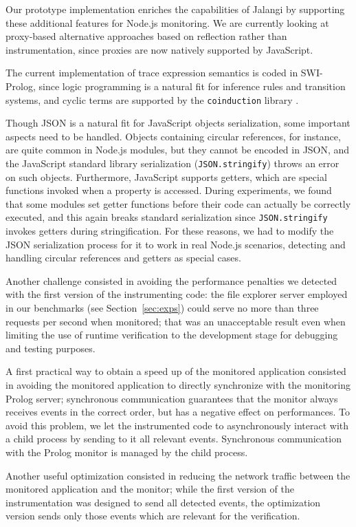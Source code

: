 Our prototype implementation enriches the capabilities of Jalangi by supporting these additional features for Node.js monitoring.
We are currently looking at proxy-based alternative approaches based on reflection rather than instrumentation, since proxies \cite{proxy} are now natively supported by JavaScript.

The current implementation of trace expression semantics is coded in SWI-Prolog, since logic programming is a natural fit for inference rules and transition systems, and cyclic terms are supported by the \texttt{coinduction} library \cite{CoLP06}.

Though JSON is a natural fit for JavaScript objects serialization, some important aspects need to be handled.
Objects containing circular references, for instance, are quite common in Node.js modules, but they cannot be encoded in JSON, and the JavaScript standard library serialization (\lstinline|JSON.stringify|) throws an error on such objects.
Furthermore, JavaScript supports getters, which are special functions invoked when a property is accessed.
During experiments, we found that some modules set getter functions before their code can actually be correctly executed, and this again breaks standard serialization since \lstinline|JSON.stringify| invokes getters during stringification.
For these reasons, we had to modify the JSON serialization process for it to work in real Node.js scenarios, detecting and handling circular references and getters as special cases.

Another challenge consisted in avoiding the performance penalties we detected with the first version of the
instrumenting code: the file explorer server employed in our benchmarks (see Section~\ref{sec:exps}) could serve no more than
three requests per second when monitored; that was an unacceptable result even when limiting
the use of runtime verification to the development stage for debugging and testing purposes.

A first practical way to obtain a speed up of the monitored application consisted in
avoiding the monitored application to directly synchronize with the monitoring Prolog server;
synchronous communication guarantees that the monitor always receives events in the correct order,
but has a negative effect on performances. To avoid this problem, we let the instrumented code
to asynchronously interact with a child process by sending to it all relevant events. Synchronous
communication with the Prolog  monitor is managed by the child process.

Another useful optimization consisted in reducing the network traffic 
between the monitored application and the monitor; while
the first version of the instrumentation was designed to send
all detected events, the optimization version sends only those events 
which are relevant for the verification.



